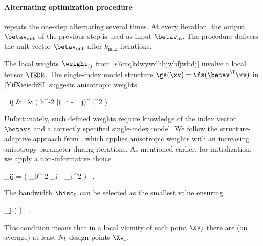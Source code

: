 \paragraph{Alternating optimization procedure} %
repeats the one-step alternating several times.
At every iteration, the output \( \betav_{\outp} \) of the previous step is used as input \( \betav_{\init} \).
The procedure delivers the unit vector \( \betav_{\outp} \) after \( k_{\max} \) iterations.



\label{SanisoSI}
The local weights \( \weight_{ij} \) from \eqref{s7cuqkdwywdhbjwbfjwbdj} involve a local tensor \( \TEDR \).
The single-index model structure \( \gs(\xv) = \fs(\betav^{\T} \xv) \) in \eqref{YifXieiedrSI} suggests
anisotropic weights
\begin{EQA}
	\weights_{ij}
	&=&
	\Kern\bigl( h^{-2} |(\Xv_{i} - \xv_{j})^{\T} \betavs|^{2} \bigr) .
\label{s7cuqkdwywdhbjwbfjwbdji}
\end{EQA}
Unfortunately, such defined weights require knowledge of the index vector \( \betavs \) and 
a correctly specified single-index model. 
We follow the structure-adaptive approach from \cite{HJPS}, which applies anisotropic weights 
with an increasing anisotropy parameter during iterations.
As mentioned earlier, for initialization, we apply a non-informative choice 
\begin{EQA}[c]
	\weight_{ij} = \Kern\bigl( \hiso_{0}^{-2} \| \Xv_{i} - \xv_{j} \|^{2} \bigr) 
	\, .
\end{EQA}
The bandwidth \( \hiso_{0} \) can be selected as the smallest value ensuring
\begin{EQA}[c]
	\sum_{j \in \JJJ} \sumI \Kern\Bigl(  \Bigr)
	\geq 
	\nmin
	\, .
\label{jhgiverkytde4w34etycj}
\end{EQA}
This condition means that in a local vicinity of each point \( \xv_{j} \) there are (on average) 
at least \( N_{l} \) design points \( \Xv_{i} \).

